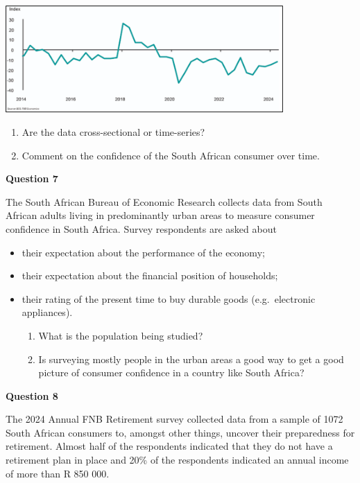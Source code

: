 \documentclass[
]{book}
\begin{document}
\includegraphics[width=4.16667in,height=\textheight]{images/clipboard-2186963206.png}

\begin{enumerate}
\def\labelenumi{\alph{enumi}.}
\item
  Are the data cross-sectional or time-series?
\item
  Comment on the confidence of the South African consumer over time.
\end{enumerate}

\hfill\break
\textbf{Question 7}

The South African Bureau of Economic Research collects data from South African adults living in predominantly urban areas to measure consumer confidence in South Africa. Survey respondents are asked about

\begin{itemize}
\item
  their expectation about the performance of the economy;
\item
  their expectation about the financial position of households;
\item
  their rating of the present time to buy durable goods (e.g.~electronic appliances).

  \begin{enumerate}
  \def\labelenumi{\alph{enumi}.}
  \item
    What is the population being studied?
  \item
    Is surveying mostly people in the urban areas a good way to get a good picture of consumer confidence in a country like South Africa?
  \end{enumerate}
\end{itemize}

\textbf{Question 8}

The 2024 Annual FNB Retirement survey collected data from a sample of 1072 South African consumers to, amongst other things, uncover their preparedness for retirement. Almost half of the respondents indicated that they do not have a retirement plan in place and 20\% of the respondents indicated an annual income of more than R 850 000.
\end{document}
